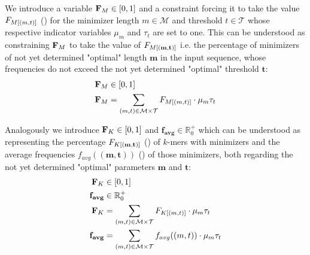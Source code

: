 \documentclass[a4paper,titlepage,onecolumn,oneside,12pt,nenglish,titlepage=firstiscover]{scrbook}
\theoremstyle{plain} %
\theoremstyle{definition} %
\theoremstyle{remark} %
\theoremstyle{plain}
\newcommand{\RR}{\mathbb{R}} %
\newcommand{\minimizerLength}{m}
\newcommand{\threshold}{t}
\newcommand{\varAverageFrequency}{\textbf{f}_{\textbf{avg}}}
\newcommand{\averageFrequency}{f_{avg}}
\newcommand{\possibleMinimizerLengths}{\mathcal{M}}
\newcommand{\possibleThresholds}{\mathcal{T}}
\newcommand{\indicatorm}{\mu}
\newcommand{\indicatort}{\tau}
\newcommand{\varMinimizerLength}{\textbf{\minimizerLength}}
\newcommand{\varThreshold}{\textbf{\threshold}}
\begin{document}
We introduce a variable $\textbf{F}_{M} \in [0,1]$ and a constraint forcing it to take the value $\CDF{\compactZV{M}{(\minimizerLength, \threshold)}}$ () for the minimizer length $\minimizerLength \in \possibleMinimizerLengths$ and threshold $\threshold \in \possibleThresholds$ whose respective indicator variables $\indicatorm_\minimizerLength$ and $\indicatort_\threshold$ are set to one. This can be understood as constraining $\textbf{F}_{M}$ to take the value of $\CDF{\compactZV{M}{(\varMinimizerLength, \varThreshold)}}$ i.e. the percentage of minimizers of not yet determined "optimal" length $\varMinimizerLength$ in the input sequence, whose frequencies do not exceed the not yet determined "optimal" threshold $\varThreshold$:
\newcommand{\cdfMExpression}{
	\varCDF{M} &= \sum\limits_{(\minimizerLength, \threshold) \in \possibleMinimizerLengths \times \possibleThresholds} \CDF{\compactZV{M}{(\minimizerLength, \threshold)}} \cdot
	\indicatorm_\minimizerLength \indicatort_\threshold
}
\begin{align}
	\varCDF{M} &\in [0,1] \label{variable:percMinimizers}\\
	\cdfMExpression \label{constraint:percMinimizers}
\end{align}

Analogously we introduce $\textbf{F}_{K} \in [0,1]$ and $\varAverageFrequency \in \RR^+_0$ which can be understood as representing the percentage $\CDF{\compactZV{K}{(\varMinimizerLength, \varThreshold)}}$ () of $k$-mers with \infrequent minimizers and the average frequencies $\averageFrequency((\varMinimizerLength, \varThreshold))$ () of those minimizers, both regarding the not yet determined "optimal" parameters $\varMinimizerLength$ and $\varThreshold$:
\newcommand{\cdfKExpression}{
	\varCDF{K} &= \sum\limits_{(\minimizerLength, \threshold) \in \possibleMinimizerLengths \times \possibleThresholds} \CDF{\compactZV{K}{(\minimizerLength, \threshold)}} \cdot
	\indicatorm_\minimizerLength \indicatort_\threshold
}
\newcommand{\varAverageFrequencyExpression}{
	\varAverageFrequency &= \sum\limits_{(\minimizerLength, \threshold) \in \possibleMinimizerLengths \times \possibleThresholds} \averageFrequency((\minimizerLength,\threshold)) \cdot
	\indicatorm_\minimizerLength \indicatort_\threshold
}
\begin{align}
	\varCDF{K} &\in [0,1] \label{variable:percKmers}\\
	\varAverageFrequency &\in \RR^+_0 \label{variable:averageFrequency}\\
	\cdfKExpression \label{constraint:percKmers}\\
	\varAverageFrequencyExpression \label{constraint:averageFrequency}
\end{align}
\end{document}
